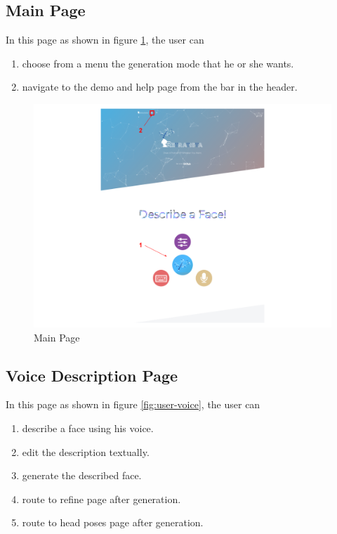 \subsection{Main Page}
In this page as shown in figure \ref{fig:user-main}, the user can 

\begin{enumerate}
    \item choose from a menu the generation mode that he or she wants.
    \item navigate to the demo and help page from the bar in the header.
\end{enumerate}
    
\begin{figure}[H]
    \centering
    \includegraphics[width=1.0\textwidth]{images/guide/main.png}
    \caption{Main Page}
    \label{fig:user-main}
\end{figure}


\subsection{Voice Description Page}
In this page as shown in figure \ref{fig:user-voice}, the user can 

\begin{enumerate}
    \item describe a face using his voice.
    \item edit the description textually.
    \item generate the described face.
    \item route to refine page after generation.
    \item route to head poses page after generation.
\end{enumerate}

